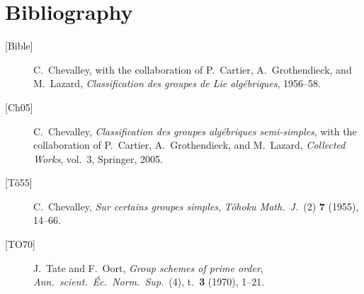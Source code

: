 \section*{Bibliography}

\begin{sloppypar}
\begin{description}
\item[{[Bible]}]
C.~Chevalley, with the collaboration of P.~Cartier,
A.~Grothendieck, and M.~Lazard,
\textit{Classification des groupes de Lie algébriques}, 1956--58.

\item[{[Ch05]}]
C.~Chevalley,
\textit{Classification des groupes algébriques semi-simples}, with
the collaboration of P.~Cartier, A.~Grothendieck, and M.~Lazard,
\textit{Collected Works}, vol.~3, Springer, 2005.

\item[{[Tô55]}]
C.~Chevalley, \textit{Sur certains groupes simples},
\textit{Tôhoku Math.\ J.}\ (2) \textbf{7} (1955), 14--66.

\item[{[TO70]}]
J.~Tate and F.~Oort, \textit{Group schemes of prime order},
\textit{Ann.\ scient.\ Éc.\ Norm.\ Sup.}\ (4), t.~\textbf{3}
(1970), 1--21.
\end{description}
\end{sloppypar}



